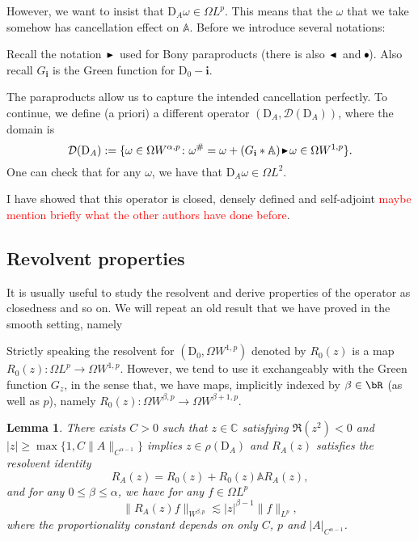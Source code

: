 \documentclass[12pt]{article}
\numberwithin{equation}{section}
\newtheorem{lemma}[theorem]{Lemma}
\theoremstyle{definition}
\theoremstyle{remark}
\newcommand{\1}{\mathbf 1}
\newcommand{\<}{\langle}
\renewcommand{\>}{\rangle}
\newcommand{\rdom}{{\hspace{1pt}\scalebox{0.8}{\raisebox{0.65pt}{$\blacktriangleleft$}}\hspace{1pt}}}
\newcommand{\ldom}{{\hspace{1pt}\scalebox{0.8}{\raisebox{0.65pt}{$\blacktriangleright$}}\hspace{1pt}}}
\newcommand{\res}{\hspace{-1.2pt}\bullet\hspace{-1.2pt}}
\newcommand{\red}[1]{\textcolor{red}{#1}}
\newcommand{\bA}{\mathbb A}
\newcommand{\bfi}{\mathbf i}
\newcommand{\cD}{\mathcal D}
\newcommand{\rmD}{\mathrm{D}}
\newcommand{\bC}{\mathbb C}
\begin{document}
However, we want to insist that $\rmD_A\omega\in\Omega L^p$. This means that the $\omega$ that we take somehow has cancellation effect on $\bA$. Before we introduce several notations:

    Recall the notation $\ldom$ used for Bony paraproducts (there is also $\rdom$ and $\res$). Also recall $G_\bfi$ is the Green function for $\rmD_0-\bfi$. 


The paraproducts allow us to capture the intended cancellation perfectly. To continue, we define (a priori) a different operator $(\rmD_A,\cD(\rmD_A))$, where the domain is 
\[
\cD(\rmD_A):=\{\omega\in\Omega W^{\alpha,p}\colon \omega^\#=\omega+(G_\bfi*\bA)\ldom \omega\in \Omega W^{1,p}\}.
\]
One can check that for any $\omega$, we have that $\rmD_A\omega\in \Omega L^2$. 

I have showed that this operator is closed, densely defined and self-adjoint \red{maybe mention briefly what the other authors have done before}. 

\subsection{Revolvent properties}
It is usually useful to study the resolvent and derive properties of the operator as closedness and so on. We will repeat an old result that we have proved in the smooth setting, namely 

\begin{notation}
Strictly speaking the resolvent for $(\rmD_0,\Omega W^{1,p})$ denoted by $R_0(z)$ is a map $R_0(z):\Omega L^p\to \Omega W^{1,p}$. However, we tend to use it exchangeably with the Green function $G_z$, in the sense that, we have maps, implicitly indexed by $\beta\in\bR$ (as well as $p$), namely $R_0(z):\Omega W^{\beta,p}\to\Omega W^{\beta+1,p}$. 
\end{notation}

\begin{lemma}\label{lem:existence_resolvent_Young}
    There exists $C>0$ such that $z\in\bC$ satisfying $\Re(z^2)<0$ and $|z|\geq \max\{1,C\|A\|_{C^{\alpha-1}}\}$ implies $z\in\rho(\rmD_A)$ and $R_A(z)$ satisfies the resolvent identity
    \[
    R_A(z)=R_0(z)+R_0(z)\bA R_A(z),
    \]
    and for any $0\leq\beta\leq\alpha$, we have for any $f\in \Omega L^p$ 
    \[
    \|R_A(z)f\|_{ W^{\beta,p}}\lesssim |z|^{\beta-1}\|f\|_{L^p}, 
    \]
    where the proportionality constant  depends on only $C$, $p$ and $|A|_{C^{\alpha-1}}$. 
    \end{lemma}
\end{document}
